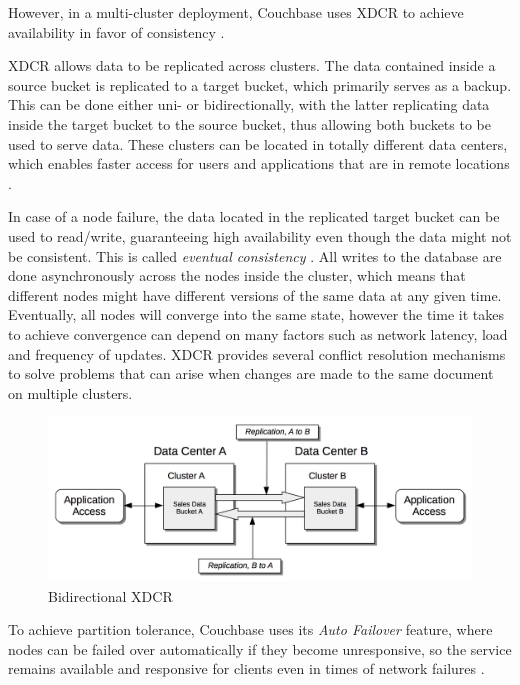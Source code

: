 However, in a multi-cluster deployment, Couchbase uses \ac{XDCR} to achieve availability in favor of consistency \parencite{CAPXDCR.2014}.

\ac{XDCR} allows data to be replicated across clusters. The data contained inside a source bucket is replicated to a target bucket, which primarily serves as a backup. This can be done either uni- or bidirectionally, with the latter replicating data inside the target bucket to the source bucket, thus allowing both buckets to be used to serve data. These clusters can be located in totally different data centers, which enables faster access for users and applications that are in remote locations \parencite{XDCR.20230402}.

In case of a node failure, the data located in the replicated target bucket can be used to read/write, guaranteeing high availability even though the data might not be consistent. This is called \textit{eventual consistency} \parencite{DonPintoPrincipalProductManager.2014}. All writes to the database are done asynchronously across the nodes inside the cluster, which means that different nodes might have different versions of the same data at any given time. Eventually, all nodes will converge into the same state, however the time it takes to achieve convergence can depend on many factors such as network latency, load and frequency of updates. \ac{XDCR} provides several conflict resolution mechanisms to solve problems that can arise when changes are made to the same document on multiple clusters.

\begin{figure}[H]
    \centering
        \includegraphics[scale=0.7]{images/bidirectional-xdcr.png}
    \caption{Bidirectional \ac{XDCR} \parencite{XDCR.20230402}}
    \label{fig:BidiXDCR}
\end{figure}

To achieve partition tolerance, Couchbase uses its \textit{Auto Failover} feature, where nodes can be failed over automatically if they become unresponsive, so the service remains available and responsive for clients even in times of network failures \parencite{Autofailover.20230402}.

